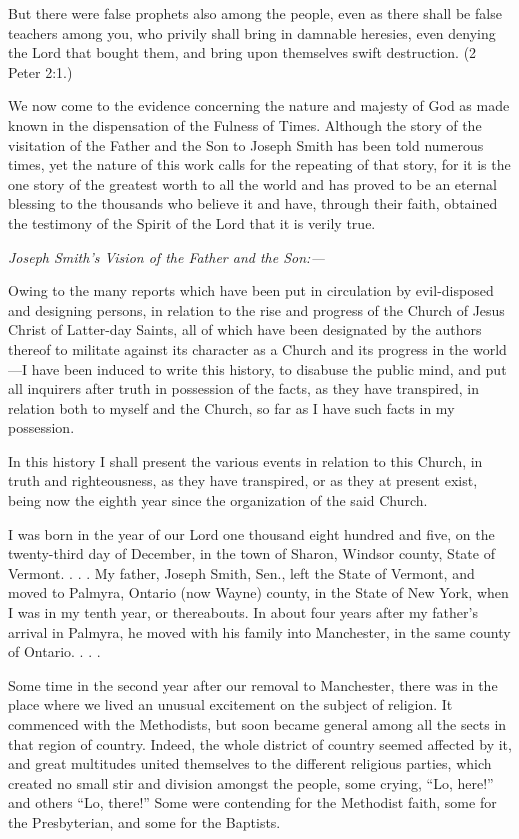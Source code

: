 But there were false prophets also among the people, even as there shall be false teachers
among you, who privily shall bring in damnable heresies, even denying the Lord that bought
them, and bring upon themselves swift destruction. (2 Peter 2:1.)

We now come to the evidence concerning the nature and majesty of God as made known in
the dispensation of the Fulness of Times. Although the story of the visitation of the Father
and the Son to Joseph Smith has been told numerous times, yet the nature of this work calls
for the repeating of that story, for it is the one story of the greatest worth to all the world and
has proved to be an eternal blessing to the thousands who believe it and have, through their
faith, obtained the testimony of the Spirit of the Lord that it is verily true.

\textit{Joseph Smith's Vision of the Father and the Son:—}

Owing to the many reports which have been put in circulation by evil-disposed and designing
persons, in relation to the rise and progress of the Church of Jesus Christ of Latter-day Saints,
all of which have been designated by the authors thereof to militate against its character as a
Church and its progress in the world—I have been induced to write this history, to disabuse
the public mind, and put all inquirers after truth in possession of the facts, as they have
transpired, in relation both to myself and the Church, so far as I have such facts in my
possession.

In this history I shall present the various events in relation to this Church, in truth and
righteousness, as they have transpired, or as they at present exist, being now the eighth year
since the organization of the said Church.

I was born in the year of our Lord one thousand eight hundred and five, on the twenty-third
day of December, in the town of Sharon, Windsor county, State of Vermont. . . . My father,
Joseph Smith, Sen., left the State of Vermont, and moved to Palmyra, Ontario (now Wayne)
county, in the State of New York, when I was in my tenth year, or thereabouts. In about four
years after my father's arrival in Palmyra, he moved with his family into Manchester, in the
same county of Ontario. . . .

Some time in the second year after our removal to Manchester, there was in the place where
we lived an unusual excitement on the subject of religion. It commenced with the Methodists,
but soon became general among all the sects in that region of country. Indeed, the whole
district of country seemed affected by it, and great multitudes united themselves to the
different religious parties, which created no small stir and division amongst the people, some
crying, ``Lo, here!'' and others ``Lo, there!'' Some were contending for the Methodist faith,
some for the Presbyterian, and some for the Baptists.

